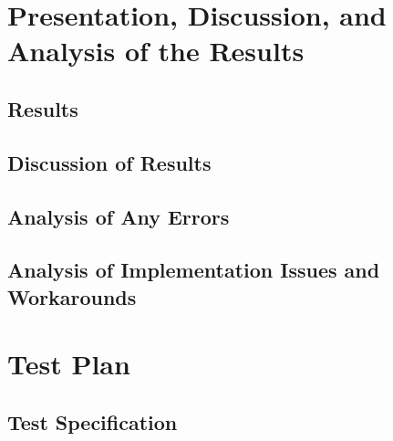 \documentclass[12pt]{article} %
\begin{document}
\section{Presentation, Discussion, and Analysis of the Results}
%
%
\subsection{Results }

\subsection{Discussion of Results }

\subsection{Analysis of Any Errors }
%

\subsection{Analysis of Implementation Issues and Workarounds}
%
%

\section{Test Plan }
%

\subsection{Test Specification}
%
%
\end{document}
